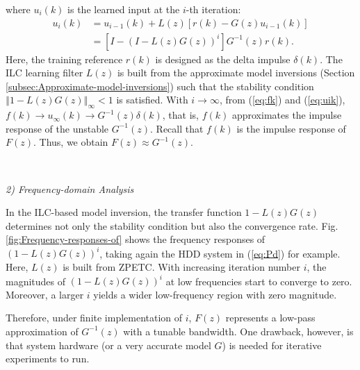\documentclass [11pt, proquest] {uwthesis}[2020/02/24]
\begin{document}
where $u_{i}(k)$ is the learned input at the $i$-th iteration:
\begin{align}
u_{i}(k) & =u_{i-1}(k)+L(z)\left[r(k)-G(z)u_{i-1}(k)\right]\nonumber \\
 & =\left[I-(I-L(z)G(z))^{i}\right]G^{-1}(z)r(k).\label{eq:uik}
\end{align}
Here, the training reference $r(k)$ is designed as the delta impulse
$\delta(k)$. The ILC learning filter $L(z)$ is built from the approximate
model inversions (Section \ref{subsec:Approximate-model-inversions})
such that the stability condition $\left\Vert 1-L(z)G(z)\right\Vert _{\infty}<1$
is satisfied. With $i\rightarrow\infty$, from (\ref{eq:fk}) and
(\ref{eq:uik}), $f(k)\rightarrow u_{\infty}(k)\rightarrow G^{-1}(z)\delta(k)$,
that is, $f(k)$ approximates the impulse response of the unstable
$G^{-1}(z)$. Recall that $f(k)$ is the impulse response of $F(z)$.
Thus, we obtain $F(z)\approx G^{-1}(z)$.

\

\noindent \emph{2) Frequency-domain Analysis}

In the ILC-based model inversion, the transfer function $1-L(z)G(z)$
determines not only the stability condition but also the convergence
rate. Fig. \ref{fig:Frequency-responses-of} shows the frequency responses
of $(1-L(z)G(z))^{i}$, taking again the HDD system in (\ref{eq:Pd})
for example. Here, $L(z)$ is built from ZPETC. With increasing iteration
number $i$, the magnitudes of $(1-L(z)G(z))^{i}$ at low frequencies
start to converge to zero. Moreover, a larger $i$ yields a wider
low-frequency region with zero magnitude. 

Therefore, under finite implementation of $i$, $F(z)$ represents
a low-pass approximation of $G^{-1}(z)$ with a tunable bandwidth.
One drawback, however, is that system hardware (or a very accurate
model $G$) is needed for iterative experiments to run.
\begin{table}
\caption{\label{tab:Overview-of-inversion}Overview of frequency-domain inversion
strategies: approximate, ILC-based, and $H_{\infty}$-based methods.
DT and CT are short for discrete time and continuous time, respectively.}

\end{table}
\end{document}
